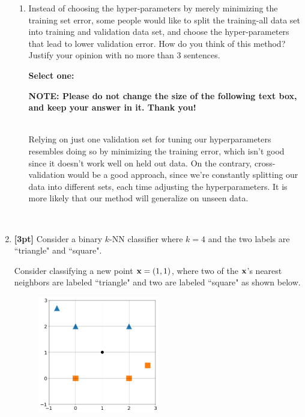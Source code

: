\begin{enumerate}
\begin{enumerate}
    \item Instead of choosing the hyper-parameters by merely minimizing the training set error, some people would like to split the training-all data set into training and validation data set, and choose the hyper-parameters that lead to lower validation error. How do you think of this method? Justify your opinion with no more than 3 sentences.

    \textbf{Select one:}

    \textbf{NOTE: Please do not change the size of the following text box, and keep your answer in it. Thank you!} \\ \\
    \begin{tcolorbox}[fit,height=4cm, width=15cm, blank, borderline={1pt}{-2pt},nobeforeafter]
    \large
    Relying on just one validation set for tuning our hyperparameters resembles doing so by minimizing the training error, which isn't good since it doesn't work well on held out data. On the contrary, cross-validation would be a good approach, since we're constantly splitting our data into different sets, each time adjusting the hyperparameters. It is more likely that our method will generalize on unseen data.

    \end{tcolorbox} \\

    \end{enumerate}
    
    
    \item \textbf{[3pt]} Consider a binary $k$-NN classifier where $k=4$ and the two labels are ``triangle" and ``square".
    
    Consider classifying a new point $\mathbf{x} =(1,1)$, where two of the $\mathbf{x}$'s nearest neighbors are labeled ``triangle" and two are labeled ``square" as shown below.
    
    \begin{figure}[H]
        \centering
        \includegraphics[width = 0.5\textwidth]{1-1-5.png}
        \label{Q_5knn}
    \end{figure}
    

\end{enumerate}
